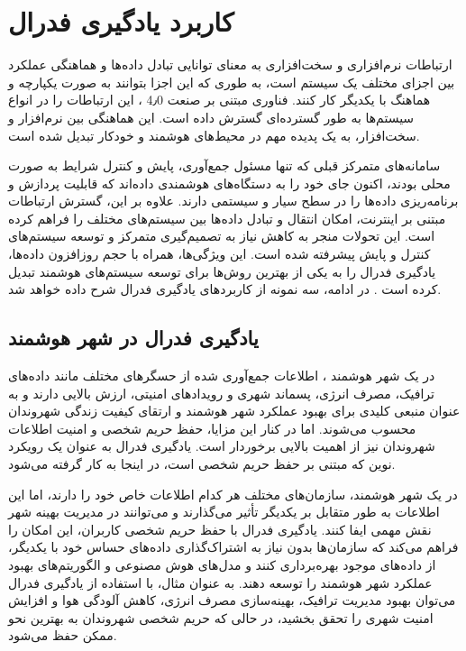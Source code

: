 \section{کاربرد یادگیری فدرال}
ارتباطات نرم‌افزاری و سخت‌افزاری به معنای توانایی تبادل داده‌ها و هماهنگی عملکرد بین اجزای مختلف یک سیستم است، به طوری که این اجزا بتوانند به صورت یکپارچه و هماهنگ با یکدیگر کار کنند. فناوری مبتنی بر صنعت 4٫0%
%
، این ارتباطات را در انواع سیستم‌ها به طور گسترده‌ای گسترش داده است. این هماهنگی بین نرم‌افزار و سخت‌افزار، به یک پدیده مهم در محیط‌های هوشمند و خودکار تبدیل شده است.

سامانه‌های متمرکز قبلی که تنها مسئول جمع‌آوری، پایش و کنترل شرایط به صورت محلی بودند، اکنون جای خود را به دستگاه‌های هوشمندی داده‌اند که قابلیت پردازش و برنامه‌ریزی داده‌ها را در سطح سیار و سیستمی دارند. علاوه بر این، گسترش ارتباطات مبتنی بر اینترنت، امکان انتقال و تبادل داده‌ها بین سیستم‌های مختلف را فراهم کرده است. این تحولات منجر به کاهش نیاز به تصمیم‌گیری متمرکز و توسعه سیستم‌های کنترل و پایش پیشرفته شده است. این ویژگی‌ها، همراه با حجم روزافزون داده‌ها، یادگیری فدرال را به یکی از بهترین روش‌ها برای توسعه سیستم‌های هوشمند تبدیل کرده است
\cite{mahtab2022algorithm}.
در ادامه، سه نمونه از کاربردهای یادگیری فدرال شرح داده خواهد شد.


\subsection{یادگیری فدرال در شهر هوشمند}
در یک شهر هوشمند%
%
، اطلاعات جمع‌آوری شده از حسگرهای مختلف مانند داده‌های ترافیک، مصرف انرژی، پسماند شهری و رویدادهای امنیتی، ارزش بالایی دارند و به عنوان منبعی کلیدی برای بهبود عملکرد شهر هوشمند و ارتقای کیفیت زندگی شهروندان محسوب می‌شوند. اما در کنار این مزایا، حفظ حریم شخصی و امنیت اطلاعات شهروندان نیز از اهمیت بالایی برخوردار است. یادگیری فدرال به عنوان یک رویکرد نوین که مبتنی بر حفظ حریم شخصی است، در اینجا به کار گرفته می‌شود.

در یک شهر هوشمند، سازمان‌های مختلف هر کدام اطلاعات خاص خود را دارند، اما این اطلاعات به طور متقابل بر یکدیگر تأثیر می‌گذارند و می‌توانند در مدیریت بهینه شهر نقش مهمی ایفا کنند. یادگیری فدرال با حفظ حریم شخصی کاربران، این امکان را فراهم می‌کند که سازمان‌ها بدون نیاز به اشتراک‌گذاری داده‌های حساس خود با یکدیگر، از داده‌های موجود بهره‌برداری کنند و مدل‌های هوش مصنوعی و الگوریتم‌های بهبود عملکرد شهر هوشمند را توسعه دهند. به عنوان مثال، با استفاده از یادگیری فدرال می‌توان بهبود مدیریت ترافیک، بهینه‌سازی مصرف انرژی، کاهش آلودگی هوا و افزایش امنیت شهری را تحقق بخشید، در حالی که حریم شخصی شهروندان به بهترین نحو ممکن حفظ می‌شود.


